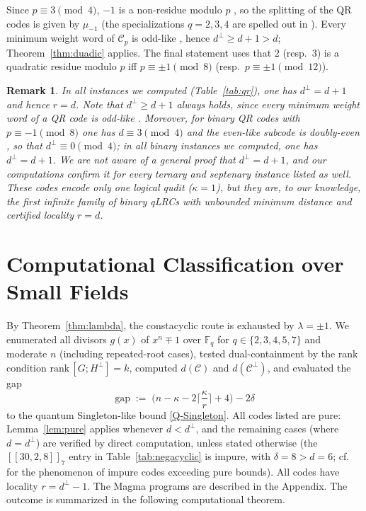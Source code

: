 \documentclass[journal,onecolumn]{IEEEtran}
\newtheorem{remark}{Remark}
\newcommand{\Ff}{{\mathbb F}}
\newcommand{\cc}{{\mathcal C}}
\newcommand{\dsb}[1]{[\![#1]\!]}
\begin{document}
\begin{IEEEproof}
Since $p\equiv 3\pmod 4$, $-1$ is a non-residue modulo $p$ \cite[Lemma~6.2.4]{Huffman2003}, so the splitting of the QR codes is given by $\mu_{-1}$ (the specializations $q=2,3,4$ are spelled out in \cite[Theorem~6.6.14]{Huffman2003}). Every minimum weight word of $\cc_p$ is odd-like \cite[Theorem~6.6.22]{Huffman2003}, hence $d^\perp\ge d+1>d$; Theorem~\ref{thm:duadic} applies. The final statement uses that $2$ (resp.~$3$) is a quadratic residue modulo $p$ iff $p\equiv\pm1\pmod 8$ (resp.~$p\equiv\pm1\pmod{12}$).
\end{IEEEproof}

\begin{remark}
In all instances we computed (Table~\ref{tab:qr}), one has $d^\perp=d+1$ and hence $r=d$. Note that $d^\perp\ge d+1$ always holds, since every minimum weight word of a QR code is odd-like \cite[Theorem~6.6.22]{Huffman2003}. Moreover, for binary QR codes with $p\equiv-1\pmod 8$ one has $d\equiv 3\pmod 4$ and the even-like subcode is doubly-even \cite[Theorems~6.6.14 and~6.6.22]{Huffman2003}, so that $d^\perp\equiv 0\pmod 4$; in all binary instances we computed, one has $d^\perp=d+1$. We are not aware of a general proof that $d^\perp=d+1$, and our computations confirm it for every ternary and septenary instance listed as well.
These codes encode only one logical qudit ($\kappa=1$), but they are, to our knowledge, the first infinite family of binary qLRCs with unbounded minimum distance and certified locality $r=d$.
\end{remark}

\section{Computational Classification over Small Fields}\label{sec:tables}

By Theorem~\ref{thm:lambda}, the constacyclic route is exhausted by $\lambda=\pm1$. We enumerated all divisors $g(x)$ of $x^n\mp1$ over $\Ff_q$ for $q\in\{2,3,4,5,7\}$ and moderate $n$ (including repeated-root cases), tested dual-containment by the rank condition $\mathrm{rank}\,[G;H^\perp]=k$, computed $d(\cc)$ and $d(\cc^\perp)$, and evaluated the gap
\[
\mathrm{gap}\;:=\;\Big(n-\kappa-2\Big\lceil\frac{\kappa}{r}\Big\rceil+4\Big)-2\delta
\]
to the quantum Singleton-like bound \eqref{Q-Singleton}. All codes listed are pure: Lemma~\ref{lem:pure} applies whenever $d<d^\perp$, and the remaining cases (where $d=d^\perp$) are verified by direct computation, unless stated otherwise (the $\dsb{30,2,8}_7$ entry in Table~\ref{tab:negacyclic} is impure, with $\delta=8>d=6$; cf.~\cite{Galindo2026} for the phenomenon of impure codes exceeding pure bounds). All codes have locality $r=d^\perp-1$. The Magma programs are described in the Appendix. The outcome is summarized in the following computational theorem.
\end{document}
